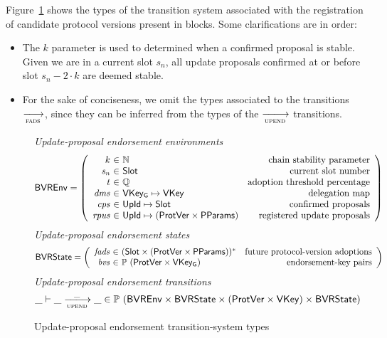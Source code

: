 Figure~\ref{fig:ts-types:up-end} shows the types of the transition system
associated with the registration of candidate protocol versions present in
blocks. Some clarifications are in order:
\begin{itemize}
\item The $k$ parameter is used to determined when a confirmed proposal is
  stable. Given we are in a current slot $s_n$, all update proposals confirmed
  at or before slot $s_n - 2 \cdot k$ are deemed stable.
\item For the sake of conciseness, we omit the types associated to the
  transitions $\trans{fads}{}$, since they can be inferred from the types of
  the $\trans{upend}{}$ transitions.
\end{itemize}

\begin{figure}[htb]
  \emph{Update-proposal endorsement environments}
  \begin{align*}
    & \BVREnv
      = \left(
      \begin{array}{r@{~\in~}lr}
        k & \mathbb{N} & \text{chain stability parameter}\\
        \var{s_n} & \Slot & \text{current slot number}\\
        t & \mathbb{Q} & \text{adoption threshold percentage}\\
        \var{dms} & \VKeyGen \mapsto \VKey & \text{delegation map}\\
        \var{cps} & \UPropId \mapsto \Slot & \text{confirmed proposals}\\
        \var{rpus} & \UPropId \mapsto (\ProtVer \times \PPMMap)
                             & \text{registered update proposals}\\
      \end{array}\right)
  \end{align*}
  \emph{Update-proposal endorsement states}
  \begin{align*}
    & \BVRState
      = \left(
      \begin{array}{r@{~\in~}lr}
        \var{fads} & \seqof{(\Slot \times (\ProtVer \times \PPMMap))}
        & \text{future protocol-version adoptions}\\
        \var{bvs} & \powerset{(\ProtVer \times \VKeyGen)}
        & \text{endorsement-key pairs}
      \end{array}\right)
  \end{align*}
  \emph{Update-proposal endorsement transitions}
    \begin{equation*}
    \_ \vdash \_ \trans{upend}{\_} \_ \in
    \powerset (\BVREnv \times \BVRState
    \times (\ProtVer \times \VKey) \times \BVRState)
    \end{equation*}
  \caption{Update-proposal endorsement transition-system types}
  \label{fig:ts-types:up-end}
\end{figure}

